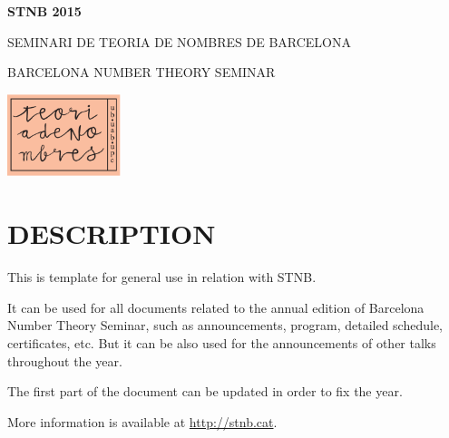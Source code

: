 \documentclass[a4paper]{article}
\begin{document}
\noindent
\begin{minipage}{0.65\textwidth}
    \fontsize{46}{44} \selectfont
	\sffamily \textbf{STNB 2015}
	
	\fontsize{10}{12} \selectfont %
	SEMINARI DE TEORIA DE NOMBRES DE BARCELONA


    \fontsize{10}{12} \selectfont %
    BARCELONA NUMBER THEORY SEMINAR
	
\end{minipage}
%
\begin{minipage}{0.35\textwidth}
\hfill\includegraphics[height=24mm]{stnb-color}
\end{minipage}


\vspace{4truecm}
\fontsize{12}{14} \selectfont

\section*{DESCRIPTION}


This is template for general use in relation with STNB.

It can be used for all documents related to the annual edition of Barcelona Number Theory Seminar, such as announcements, program, detailed schedule, certificates, etc. But it can be also used for the announcements of other talks throughout the year.

The first part of the document can be updated in order to fix the year.


More information is available at \href{http://stnb.cat}{http://stnb.cat}.
\end{document}
